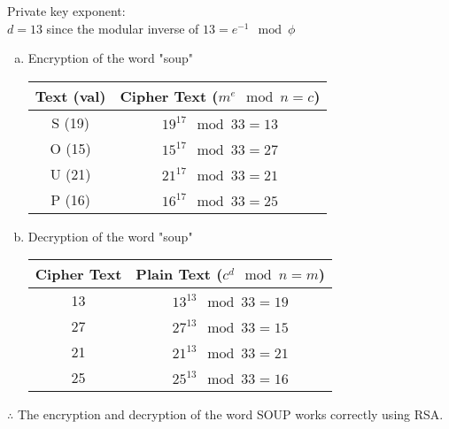 \documentclass[fleqn, 12pt]{article}
\begin{document}
Private key exponent:\\
$d = 13$ since the modular inverse of $13 = e^{-1} \mod \phi$

\begin{enumerate}[a)]
    \item
        Encryption of the word "soup"

        \begin{tabular}{|c|c|}
            \hline
                Text (val) & Cipher Text ($m^e \mod n = c$)\\\hline
                S (19)       & $19^17 \mod 33 = 13$ \\\hline
                O (15)       & $15^17 \mod 33 = 27$ \\\hline
                U (21)       & $21^17 \mod 33 = 21$ \\\hline
                P (16)       & $16^17 \mod 33 = 25$ \\
            \hline
        \end{tabular}

    \item
        Decryption of the word "soup"

        \begin{tabular}{|c|c|}
            \hline
                Cipher Text & Plain Text ($c^d \mod n = m$)\\\hline
                13          & $13^13 \mod 33 = 19$ \\\hline
                27          & $27^13 \mod 33 = 15$ \\\hline
                21          & $21^13 \mod 33 = 21$ \\\hline
                25          & $25^13 \mod 33 = 16$ \\
            \hline
        \end{tabular}

\end{enumerate}

$\therefore$ The encryption and decryption of the word SOUP works correctly using RSA.
\end{document}
